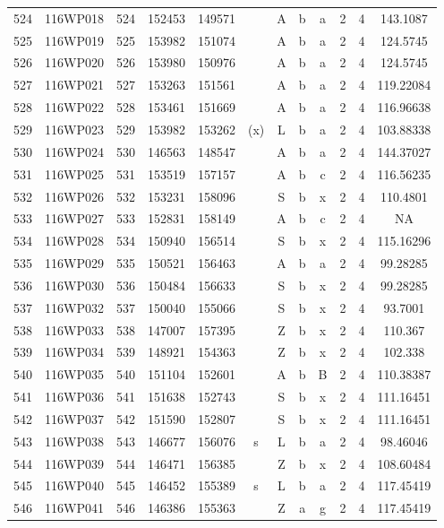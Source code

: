 \begin{tabular}{|*{12}{c|}}
524 & 116WP018 & 524 & 152453 & 149571 &  & A & b & a & 2 & 4 & 143.1087 \\ 
525 & 116WP019 & 525 & 153982 & 151074 &  & A & b & a & 2 & 4 & 124.5745 \\ 
526 & 116WP020 & 526 & 153980 & 150976 &  & A & b & a & 2 & 4 & 124.5745 \\ 
527 & 116WP021 & 527 & 153263 & 151561 &  & A & b & a & 2 & 4 & 119.22084 \\ 
528 & 116WP022 & 528 & 153461 & 151669 &  & A & b & a & 2 & 4 & 116.96638 \\ 
529 & 116WP023 & 529 & 153982 & 153262 & (x) & L & b & a & 2 & 4 & 103.88338 \\ 
530 & 116WP024 & 530 & 146563 & 148547 &  & A & b & a & 2 & 4 & 144.37027 \\ 
531 & 116WP025 & 531 & 153519 & 157157 &  & A & b & c & 2 & 4 & 116.56235 \\ 
532 & 116WP026 & 532 & 153231 & 158096 &  & S & b & x & 2 & 4 & 110.4801 \\ 
533 & 116WP027 & 533 & 152831 & 158149 &  & A & b & c & 2 & 4 & NA \\ 
534 & 116WP028 & 534 & 150940 & 156514 &  & S & b & x & 2 & 4 & 115.16296 \\ 
535 & 116WP029 & 535 & 150521 & 156463 &  & A & b & a & 2 & 4 & 99.28285 \\ 
536 & 116WP030 & 536 & 150484 & 156633 &  & S & b & x & 2 & 4 & 99.28285 \\ 
537 & 116WP032 & 537 & 150040 & 155066 &  & S & b & x & 2 & 4 & 93.7001 \\ 
538 & 116WP033 & 538 & 147007 & 157395 &  & Z & b & x & 2 & 4 & 110.367 \\ 
539 & 116WP034 & 539 & 148921 & 154363 &  & Z & b & x & 2 & 4 & 102.338 \\ 
540 & 116WP035 & 540 & 151104 & 152601 &  & A & b & B & 2 & 4 & 110.38387 \\ 
541 & 116WP036 & 541 & 151638 & 152743 &  & S & b & x & 2 & 4 & 111.16451 \\ 
542 & 116WP037 & 542 & 151590 & 152807 &  & S & b & x & 2 & 4 & 111.16451 \\ 
543 & 116WP038 & 543 & 146677 & 156076 & s & L & b & a & 2 & 4 & 98.46046 \\ 
544 & 116WP039 & 544 & 146471 & 156385 &  & Z & b & x & 2 & 4 & 108.60484 \\ 
545 & 116WP040 & 545 & 146452 & 155389 & s & L & b & a & 2 & 4 & 117.45419 \\ 
546 & 116WP041 & 546 & 146386 & 155363 &  & Z & a & g & 2 & 4 & 117.45419 \\ 

\end{tabular}

